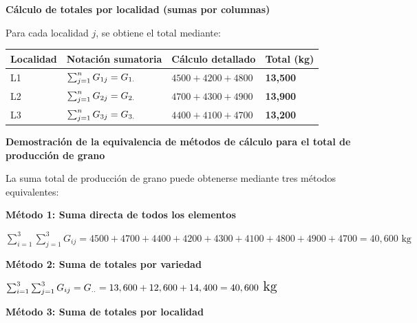 \documentclass[
  spanish,
  letterpaper,
]{book}
\begin{document}
\textbf{Cálculo de totales por localidad (sumas por columnas)}

Para cada localidad \(j\), se obtiene el total mediante:

\begin{longtable}[]{@{}
  >{\centering\arraybackslash}p{}
  >{\centering\arraybackslash}p{}
  >{\centering\arraybackslash}p{}
  >{\centering\arraybackslash}p{}@{}}
\toprule\noalign{}
\begin{minipage}[b]{\linewidth}\centering
Localidad
\end{minipage} & \begin{minipage}[b]{\linewidth}\centering
Notación sumatoria
\end{minipage} & \begin{minipage}[b]{\linewidth}\centering
Cálculo detallado
\end{minipage} & \begin{minipage}[b]{\linewidth}\centering
Total (kg)
\end{minipage} \\
\midrule\noalign{}
\endhead
\bottomrule\noalign{}
\endlastfoot
L1 & \(\large \sum_{j=1}^{n} G_{1j} = G_{1.} \) & \(4500 + 4200 + 4800\)
& \textbf{13,500} \\
L2 & \(\large \sum_{j=1}^{n} G_{2j} = G_{2.} \) & \(4700 + 4300 + 4900\)
& \textbf{13,900} \\
L3 & \(\large \sum_{j=1}^{n} G_{3j} = G_{3.} \) & \(4400 + 4100 + 4700\)
& \textbf{13,200} \\
\end{longtable}

\textbf{Demostración de la equivalencia de métodos de cálculo para el
total de producción de grano}

La suma total de producción de grano puede obtenerse mediante tres
métodos equivalentes:

\textbf{Método 1: Suma directa de todos los elementos}

\(\sum_{i=1}^{3} \sum_{j=1}^{3} G_{ij} = 4500 + 4700 + 4400 + 4200 + 4300 + 4100 + 4800 + 4900 + 4700 = 40,600 \text{ kg}\)

\textbf{Método 2: Suma de totales por variedad}

\(\Large \sum_{i=1}^{3} \sum_{j=1}^{3} G_{ij} = G_{..} = 13,600 + 12,600 + 14,400 = 40,600 \text{ kg}\)

\textbf{Método 3: Suma de totales por localidad}
\end{document}
